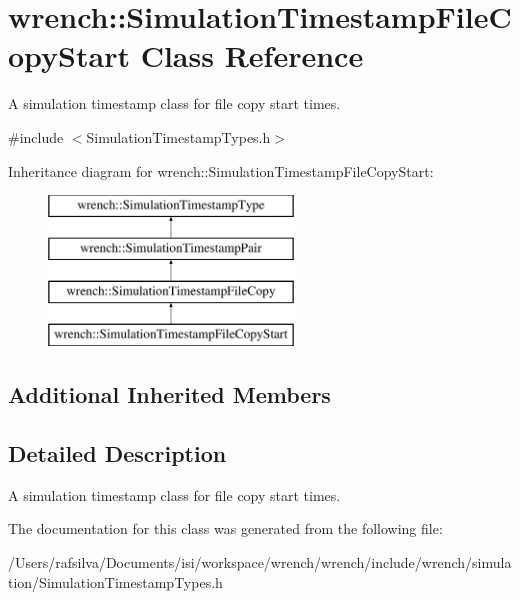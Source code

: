 \hypertarget{classwrench_1_1_simulation_timestamp_file_copy_start}{}\section{wrench\+:\+:Simulation\+Timestamp\+File\+Copy\+Start Class Reference}
\label{classwrench_1_1_simulation_timestamp_file_copy_start}


A simulation timestamp class for file copy start times.  




{\ttfamily \#include $<$Simulation\+Timestamp\+Types.\+h$>$}

Inheritance diagram for wrench\+:\+:Simulation\+Timestamp\+File\+Copy\+Start\+:\begin{figure}[H]
\begin{center}
\leavevmode
\includegraphics[height=4.000000cm]{classwrench_1_1_simulation_timestamp_file_copy_start}
\end{center}
\end{figure}
\subsection*{Additional Inherited Members}


\subsection{Detailed Description}
A simulation timestamp class for file copy start times. 

The documentation for this class was generated from the following file\+:\begin{DoxyCompactItemize}
\item 
/\+Users/rafsilva/\+Documents/isi/workspace/wrench/wrench/include/wrench/simulation/Simulation\+Timestamp\+Types.\+h\end{DoxyCompactItemize}
